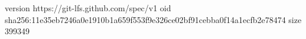 version https://git-lfs.github.com/spec/v1
oid sha256:11e35eb7246a0e1910b1a659f553f9e326ce02bf91cebba0f14a1ecfb2e78474
size 399349
